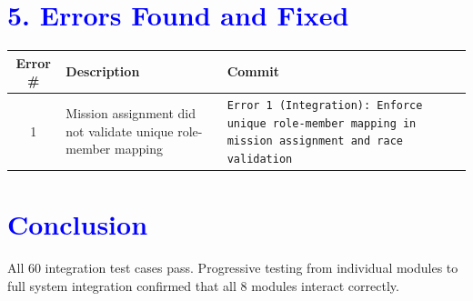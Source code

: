 \documentclass{article}
\begin{document}
\section*{\textcolor{blue}{5. Errors Found and Fixed}}

\begin{center}
\begin{tabular}{cll}
\toprule
Error \# & Description & Commit \\
\midrule
1 & Mission assignment did not validate unique role-member mapping & \texttt{Error 1 (Integration): Enforce unique role-member mapping in mission assignment and race validation} \\
\bottomrule
\end{tabular}
\end{center}

\section*{\textcolor{blue}{Conclusion}}
All 60 integration test cases pass. Progressive testing from individual modules to full system integration confirmed that all 8 modules interact correctly.
\end{document}
